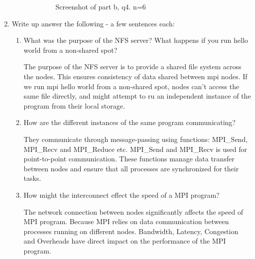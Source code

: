 \documentclass{article}
\begin{document}
\begin{enumerate}
\begin{enumerate}
\begin{enumerate}
\begin{figure}[H]
        \caption{Screenshot of part b, q4. n=6}
      \end{figure}
    \end{enumerate}
  \end{enumerate}
  \item Write up answer the following - a few sentences each:
  \begin{enumerate}
    \item What was the purpose of the NFS server? What happens if you run hello world from a non-shared spot?

    The purpose of the NFS server is to provide a shared file system across the nodes.
    This ensures consistency of data shared between mpi nodes.
    If we run mpi hello world from a non-shared spot, nodes can't access the same file directly, and might attempt to ru an independent instance of the program from their local storage.

    \item How are the different instances of the same program communicating?

    They communicate through message-passing using functions: MPI\_Send, MPI\_Recv and MPI\_Reduce etc.
    MPI\_Send and MPI\_Recv is used for point-to-point communication.
    These functions manage data transfer between nodes and ensure that all processes are synchronized for their tasks.

    \item How might the interconnect effect the speed of a MPI program?

    The network connection between nodes significantly affects the speed of MPI program.
    Because MPI relies on data communication between processes running on different nodes.
    Bandwidth, Latency, Congestion and Overheads have direct impact on the performance of the MPI program.
  \end{enumerate}

\end{enumerate}
\end{document}
